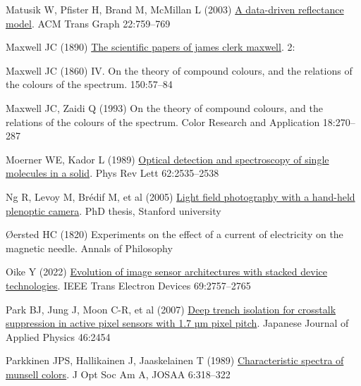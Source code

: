 \documentclass[
  letterpaper,
]{book}
\newlength{\cslhangindent}
\newenvironment{CSLReferences}[2] %
 {\begin{list}{}{%
  \setlength{\itemindent}{0pt}
  \setlength{\leftmargin}{0pt}
  \setlength{\parsep}{0pt}
  \ifodd #1
   \setlength{\leftmargin}{\cslhangindent}
   \setlength{\itemindent}{-1\cslhangindent}
  \fi
  \setlength{\itemsep}{#2\baselineskip}}}
 {\end{list}}
\begin{document}
\begin{CSLReferences}{1}{1}
Matusik W, Pfister H, Brand M, McMillan L (2003)
\href{https://dl.acm.org/doi/10.1145/882262.882343}{A data-driven
reflectance model}. ACM Trans Graph 22:759--769

Maxwell JC (1890)
\href{https://books.google.com/books?hl=en&lr=&id=LrI-AQAAMAAJ&oi=fnd&pg=PP12&dq=The+scientific+papers+of+james+clerk+maxwell&ots=MCxHuT5v8p&sig=BFG00TQBjNufpeEDQFNs6JXUXn4}{The
scientific papers of james clerk maxwell}. 2:

Maxwell JC (1860) {IV}. {On} the theory of compound colours, and the
relations of the colours of the spectrum. 150:57--84

Maxwell JC, Zaidi Q (1993) On the theory of compound colours, and the
relations of the colours of the spectrum. Color Research and Application
18:270--287

Moerner WE, Kador L (1989)
\href{http://dx.doi.org/10.1103/physrevlett.62.2535}{Optical detection
and spectroscopy of single molecules in a solid}. Phys Rev Lett
62:2535--2538

Ng R, Levoy M, Brédif M, et al (2005)
\href{'https://hal.science/hal-02551481'}{Light field photography with a
hand-held plenoptic camera}. PhD thesis, Stanford university

Øersted HC (1820) Experiments on the effect of a current of electricity
on the magnetic needle. Annals of Philosophy

Oike Y (2022)
\href{https://ieeexplore.ieee.org/abstract/document/9494712/}{Evolution
of image sensor architectures with stacked device technologies}. IEEE
Trans Electron Devices 69:2757--2765

Park BJ, Jung J, Moon C-R, et al (2007)
\href{http://dx.doi.org/10.1143/jjap.46.2454/meta}{Deep trench isolation
for crosstalk suppression in active pixel sensors with 1.7 µm pixel
pitch}. Japanese Journal of Applied Physics 46:2454

Parkkinen JPS, Hallikainen J, Jaaskelainen T (1989)
\href{https://opg.optica.org/abstract.cfm?uri=josaa-6-2-318}{Characteristic
spectra of munsell colors}. J Opt Soc Am A, JOSAA 6:318--322


\end{CSLReferences}
\end{document}
